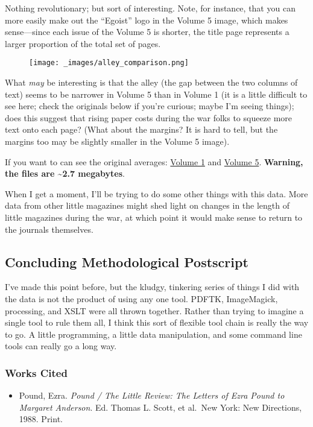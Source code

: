 \documentclass[
  12pt,
]{article}
\providecommand{\tightlist}{%
  \setlength{\itemsep}{0pt}\setlength{\parskip}{0pt}}
\begin{document}
Nothing revolutionary; but sort of interesting. Note, for instance, that
you can more easily make out the ``Egoist'' logo in the Volume 5 image,
which makes sense---since each issue of the Volume 5 is shorter, the
title page represents a larger proportion of the total set of pages.

\par\begin{figure}\centering\texttt{[image: \_images/alley\_comparison.png]}\caption{}\end{figure}

What \emph{may} be interesting is that the alley (the gap between the
two columns of text) seems to be narrower in Volume 5 than in Volume 1
(it is a little difficult to see here; check the originals below if
you're curious; maybe I'm seeing things); does this suggest that rising
paper costs during the war folks to squeeze more text onto each page?
(What about the margins? It is hard to tell, but the margins too may be
slightly smaller in the Volume 5 image).

If you want to can see the original averages:
\href{/images/Vol1-average.png}{Volume 1} and
\href{/images/Vol5-average.png}{Volume 5}. \textbf{Warning, the files
are \textasciitilde2.7 megabytes}.

When I get a moment, I'll be trying to do some other things with this
data. More data from other little magazines might shed light on changes
in the length of little magazines during the war, at which point it
would make sense to return to the journals themselves.

\hypertarget{concluding-methodological-postscript}{%
\subsection{Concluding Methodological
Postscript}\label{concluding-methodological-postscript}}

I've made this point before, but the kludgy, tinkering series of things
I did with the data is not the product of using any one tool. PDFTK,
ImageMagick, processing, and XSLT were all thrown together. Rather than
trying to imagine a single tool to rule them all, I think this sort of
flexible tool chain is really the way to go. A little programming, a
little data manipulation, and some command line tools can really go a
long way.

\hypertarget{works-cited}{%
\subsubsection{Works Cited}\label{works-cited}}

\begin{itemize}
\tightlist
\item
  Pound, Ezra. \emph{Pound / The Little Review: The Letters of Ezra
  Pound to Margaret Anderson}. Ed. Thomas L. Scott, et al.~New York: New
  Directions, 1988. Print.
\end{itemize}
\end{document}
